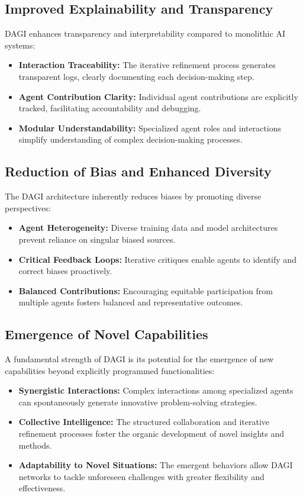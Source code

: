 \documentclass[12pt]{amsart}
\begin{document}
\subsection{Improved Explainability and Transparency}

DAGI enhances transparency and interpretability compared to monolithic AI systems:

\begin{itemize}
    \item \textbf{Interaction Traceability:} The iterative refinement process generates transparent logs, clearly documenting each decision-making step.
    \item \textbf{Agent Contribution Clarity:} Individual agent contributions are explicitly tracked, facilitating accountability and debugging.
    \item \textbf{Modular Understandability:} Specialized agent roles and interactions simplify understanding of complex decision-making processes.
\end{itemize}

\subsection{Reduction of Bias and Enhanced Diversity}

The DAGI architecture inherently reduces biases by promoting diverse perspectives:

\begin{itemize}
    \item \textbf{Agent Heterogeneity:} Diverse training data and model architectures prevent reliance on singular biased sources.
    \item \textbf{Critical Feedback Loops:} Iterative critiques enable agents to identify and correct biases proactively.
    \item \textbf{Balanced Contributions:} Encouraging equitable participation from multiple agents fosters balanced and representative outcomes.
\end{itemize}

\subsection{Emergence of Novel Capabilities}

A fundamental strength of DAGI is its potential for the emergence of new capabilities beyond explicitly programmed functionalities:

\begin{itemize}
    \item \textbf{Synergistic Interactions:} Complex interactions among specialized agents can spontaneously generate innovative problem-solving strategies.
    \item \textbf{Collective Intelligence:} The structured collaboration and iterative refinement processes foster the organic development of novel insights and methods.
    \item \textbf{Adaptability to Novel Situations:} The emergent behaviors allow DAGI networks to tackle unforeseen challenges with greater flexibility and effectiveness.
\end{itemize}
\end{document}
